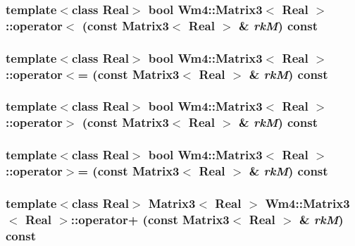 \subsubsection{\setlength{\rightskip}{0pt plus 5cm}template$<$class Real$>$ bool {\bf Wm4::Matrix3}$<$ Real $>$::operator$<$ (const {\bf Matrix3}$<$ Real $>$ \& {\em rk\-M}) const}\label{classWm4_1_1Matrix3_5a90ac9e5ee24b8c5de4ba0b7ed3669d}


\subsubsection{\setlength{\rightskip}{0pt plus 5cm}template$<$class Real$>$ bool {\bf Wm4::Matrix3}$<$ Real $>$::operator$<$= (const {\bf Matrix3}$<$ Real $>$ \& {\em rk\-M}) const}\label{classWm4_1_1Matrix3_5ab25b19bf30745c63d65b6fe4c50ab0}


\subsubsection{\setlength{\rightskip}{0pt plus 5cm}template$<$class Real$>$ bool {\bf Wm4::Matrix3}$<$ Real $>$::operator$>$ (const {\bf Matrix3}$<$ Real $>$ \& {\em rk\-M}) const}\label{classWm4_1_1Matrix3_a31eccd98196a1cd120cc4d15aae6194}


\subsubsection{\setlength{\rightskip}{0pt plus 5cm}template$<$class Real$>$ bool {\bf Wm4::Matrix3}$<$ Real $>$::operator$>$= (const {\bf Matrix3}$<$ Real $>$ \& {\em rk\-M}) const}\label{classWm4_1_1Matrix3_7422d6c41b69cd09d26df62fc54fd1fd}


\subsubsection{\setlength{\rightskip}{0pt plus 5cm}template$<$class Real$>$ {\bf Matrix3}$<$ Real $>$ {\bf Wm4::Matrix3}$<$ Real $>$::operator+ (const {\bf Matrix3}$<$ Real $>$ \& {\em rk\-M}) const\hspace{0.3cm}{\tt  [inline]}}\label{classWm4_1_1Matrix3_8240b6acf1b11c538ba435086a5c5d0f}


